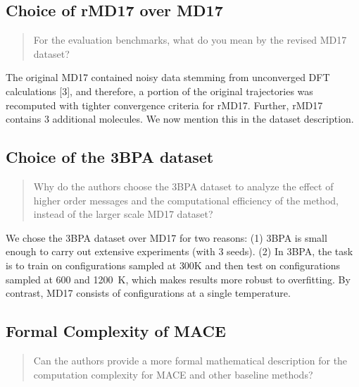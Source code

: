 \documentclass{article}
\begin{document}
\subsection*{Choice of rMD17 over MD17}

\begin{quote}
For the evaluation benchmarks, what do you mean by the revised MD17 dataset?
\end{quote}

The original MD17 contained noisy data stemming from unconverged DFT calculations [3], and therefore, a portion of the original trajectories was recomputed with tighter convergence criteria for rMD17.
Further, rMD17 contains 3 additional molecules.
We now mention this in the dataset description.

\subsection*{Choice of the 3BPA dataset}

\begin{quote}
Why do the authors choose the 3BPA dataset to analyze the effect of higher order messages and the computational efficiency of the method, instead of the larger scale MD17 dataset?
\end{quote}

We chose the 3BPA dataset over MD17 for two reasons:
(1) 3BPA is small enough to carry out extensive experiments (with 3 seeds).
(2) In 3BPA, the task is to train on configurations sampled at 300K and then test on configurations sampled at 600 and 1200~K, which makes results more robust to overfitting.
By contrast, MD17 consists of configurations at a single temperature.

\subsection*{Formal Complexity of MACE}
\begin{quote}
Can the authors provide a more formal mathematical description for the computation complexity for MACE and other baseline methods?
\end{quote}
\end{document}
